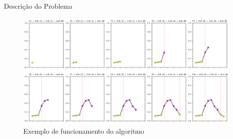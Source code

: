 \documentclass[10pt]{beamer}
\begin{document}
\begin{frame}{Descrição do Problema}
    \begin{figure}[H]
        \begin{center}
            \includegraphics[width=\textwidth]{../text/imagens/funcionamento_algoritmo.png}
            \caption{Exemplo de funcionamento do algoritmo}
            \label{fig:funcionamento_algoritmo}
        \end{center}
    \end{figure}
\end{frame}

\end{document}
